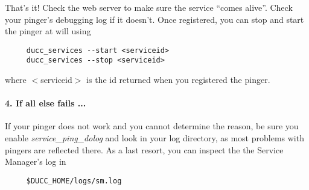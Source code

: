       That's it!  Check the web server to make sure the service ``comes alive''.  Check your pinger's
      debugging log if it doesn't.  Once registered, you can stop and start the pinger at will using
\begin{verbatim}
     ducc_services --start <serviceid>
     ducc_services --stop <serviceid>
\end{verbatim}
     where $<$serviceid$>$ is the id returned when you registered the pinger.

     \paragraph{4. If all else fails ...}
     If your pinger does not work and you cannot determine the reason, be sure you enable {\em service\_ping\_dolog} and
     look in your log directory, as most problems with pingers are reflected there.  As a last resort, you can
     inspect the the Service Manager's log in
\begin{verbatim}
     $DUCC_HOME/logs/sm.log
\end{verbatim}
     
